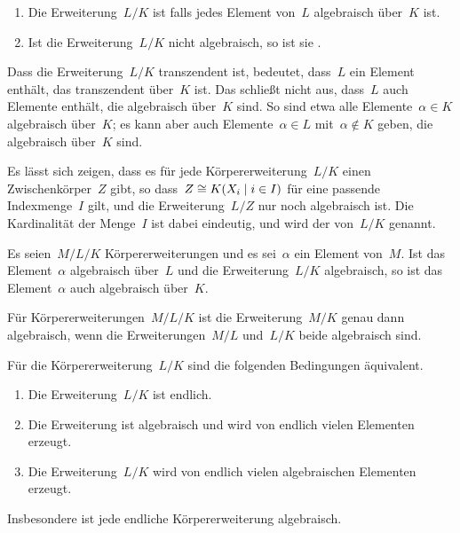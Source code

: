 \begin{definition}
  \leavevmode
  \begin{enumerate}
    \item
      Die Erweiterung~$L/K$ ist  falls jedes Element von~$L$ algebraisch über~$K$ ist.
    \item
      Ist die Erweiterung~$L/K$ nicht algebraisch, so ist sie .
  \end{enumerate}
\end{definition}

\begin{warning}
  Dass die Erweiterung~$L/K$ transzendent ist, bedeutet, dass~$L$ ein Element enthält, das transzendent über~$K$ ist.
  Das schließt nicht aus, dass~$L$ auch Elemente enthält, die algebraisch über~$K$ sind.
  So sind etwa alle Elemente~$\alpha \in K$ algebraisch über~$K$;
  es kann aber auch Elemente~$\alpha \in L$ mit~$\alpha \notin K$ geben, die algebraisch über~$K$ sind.
\end{warning}

\begin{remark}
  Es lässt sich zeigen, dass es für jede Körpererweiterung~$L/K$ einen Zwischenkörper~$Z$ gibt, so dass~$Z \cong K(X_i \suchthat i \in I)$ für eine passende Indexmenge~$I$ gilt, und die Erweiterung~$L/Z$ nur noch algebraisch ist.
  Die Kardinalität der Menge~$I$ ist dabei eindeutig, und wird der  von~$L/K$ genannt.
\end{remark}

\begin{lemma}
  Es seien~$M/L/K$ Körpererweiterungen und es sei~$\alpha$ ein Element von~$M$.
  Ist das Element~$\alpha$ algebraisch über~$L$ und die Erweiterung~$L/K$ algebraisch, so ist das Element~$\alpha$ auch algebraisch über~$K$.
\end{lemma}

\begin{proposition}
  Für Körpererweiterungen~$M/L/K$ ist die Erweiterung~$M/K$ genau dann algebraisch, wenn die Erweiterungen~$M/L$ und~$L/K$ beide algebraisch sind.
\end{proposition}

\begin{proposition}
  Für die Körpererweiterung~$L/K$ sind die folgenden Bedingungen äquivalent.
  \begin{enumerate}
    \item
      Die Erweiterung~$L/K$ ist endlich.
    \item
      Die Erweiterung ist algebraisch und wird von endlich vielen Elementen erzeugt.
    \item
      Die Erweiterung~$L/K$ wird von endlich vielen algebraischen Elementen erzeugt.
  \end{enumerate}
  Insbesondere ist jede endliche Körpererweiterung algebraisch.
\end{proposition}

